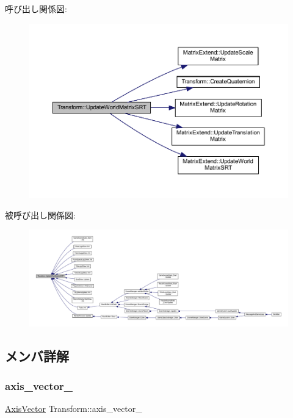 呼び出し関係図\+:\nopagebreak
\begin{figure}[H]
\begin{center}
\leavevmode
\includegraphics[width=350pt]{class_transform_af1a2dcb4a9d37dd71c203ec248535887_cgraph}
\end{center}
\end{figure}
被呼び出し関係図\+:
\nopagebreak
\begin{figure}[H]
\begin{center}
\leavevmode
\includegraphics[width=350pt]{class_transform_af1a2dcb4a9d37dd71c203ec248535887_icgraph}
\end{center}
\end{figure}


\subsection{メンバ詳解}
\mbox{\label{class_transform_a2bde97ec180664c5587c445737c04cbe}} 
\subsubsection{\texorpdfstring{axis\+\_\+vector\+\_\+}{axis\_vector\_}}
{\footnotesize\ttfamily \mbox{\hyperlink{class_axis_vector}{Axis\+Vector}} Transform\+::axis\+\_\+vector\+\_\+\hspace{0.3cm}{\ttfamily [private]}}



